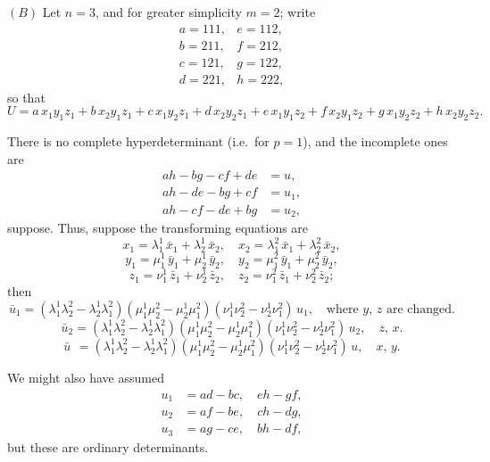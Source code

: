 \documentclass[11pt,a4paper]{article}
\theoremstyle{plain}
\theoremstyle{definition}
\theoremstyle{remark}
\begin{document}
$(B)$ Let $n=3$, and for greater simplicity $m=2$; write
\[
\begin{array}{cc}
a = 111,& e = 112, \\
b = 211,& f = 212, \\
c = 121,& g = 122, \\
d = 221,& h = 222,
\end{array}
\]
so that
\[
U = a\,x_1y_1z_1 + b\,x_2y_1z_1 + c\,x_1y_2z_1 + d\,x_2y_2z_1 + e\,x_1y_1z_2 + f\,x_2y_1z_2 + g\,x_1y_2z_2 + h\,x_2y_2z_2.
\]

\newpage

There is no complete hyperdeterminant (i.e.\ for $p=1$), and the incomplete ones are
\begin{align*}
ah-bg-cf+de &= u, \\
ah-de-bg+cf &= u_1, \\
ah-cf-de+bg &= u_2,
\end{align*}
suppose. Thus, suppose the transforming equations are
\[
x_1 = \lambda_1^1\,\bar{x}_1 + \lambda_2^1\,\bar{x}_2,\quad
x_2 = \lambda_1^2\,\bar{x}_1 + \lambda_2^2\,\bar{x}_2,
\]
\[
y_1 = \mu_1^1\,\bar{y}_1 + \mu_2^1\,\bar{y}_2,\quad
y_2 = \mu_1^2\,\bar{y}_1 + \mu_2^2\,\bar{y}_2,
\]
\[
z_1 = \nu_1^1\,\bar{z}_1 + \nu_2^1\,\bar{z}_2,\quad
z_2 = \nu_1^2\,\bar{z}_1 + \nu_2^2\,\bar{z}_2;
\]
then
\[
\bar{u}_1 = (\lambda_1^1\lambda_2^2 - \lambda_2^1\lambda_1^2)(\mu_1^1\mu_2^2 - \mu_2^1\mu_1^2)(\nu_1^1\nu_2^2 - \nu_2^1\nu_1^2)\,u_1,\quad
\text{where $y$, $z$ are changed.}
\]
\[
\bar{u}_2 = (\lambda_1^1\lambda_2^2 - \lambda_2^1\lambda_1^2)(\mu_1^1\mu_2^2 - \mu_2^1\mu_1^2)(\nu_1^1\nu_2^2 - \nu_2^1\nu_1^2)\,u_2,\quad
\text{$z$, $x$.}
\]
\[
\bar{u}\phantom{_1} = (\lambda_1^1\lambda_2^2 - \lambda_2^1\lambda_1^2)(\mu_1^1\mu_2^2 - \mu_2^1\mu_1^2)(\nu_1^1\nu_2^2 - \nu_2^1\nu_1^2)\,u,\quad
\text{$x$, $y$.}
\]

We might also have assumed
\begin{align*}
u_1 &= ad - bc,\quad eh - gf, \\
u_2 &= af - be,\quad ch - dg, \\
u_3 &= ag - ce,\quad bh - df,
\end{align*}
but these are ordinary determinants.
\end{document}
